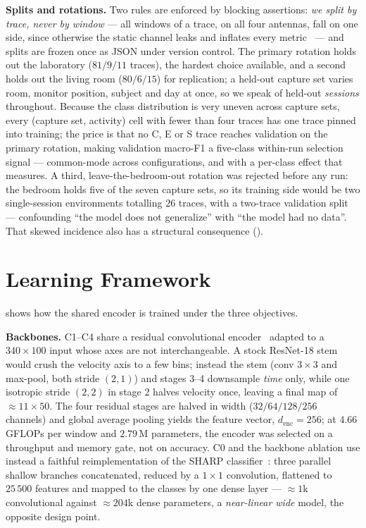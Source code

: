 \textbf{Splits and rotations.} Two rules are enforced by blocking assertions:
\emph{we split by trace, never by window} --- all windows of a trace, on all
four antennas, fall on one side, since otherwise the static channel leaks and
inflates every metric~\cite{Hammerla-2015} --- and splits are frozen once as JSON under version
control. The primary rotation holds out the laboratory ($81/9/11$ traces), the
hardest choice available, and a second holds out the living room ($80/6/15$)
for replication; a held-out capture set varies room, monitor position, subject
and day at once, so we speak of held-out \emph{sessions} throughout. Because
the class distribution is very uneven across capture sets, every (capture set,
activity) cell with fewer than four traces has one trace pinned into training;
the price is that no C, E or S trace reaches validation on the primary
rotation, making validation macro-F1 a five-class within-run selection signal
--- common-mode across configurations, and with a per-class effect that
 measures. A third, leave-the-bedroom-out rotation was
rejected before any run: the bedroom holds five of the seven capture sets, so
its training side would be two single-session environments totalling $26$
traces, with a two-trace validation split --- confounding ``the model does not
generalize'' with ``the model had no data''. That skewed incidence also has a
structural consequence ().

\section{Learning Framework}
\label{sec:learning_framework}

 shows how the shared encoder is trained under the three
objectives.

\textbf{Backbones.} C1--C4 share a residual convolutional
encoder~\cite{He-2016} adapted to a $340\times100$ input whose axes are not
interchangeable. A stock ResNet-18 stem would crush the velocity axis to a few
bins; instead the stem (conv $3{\times}3$ and max-pool, both stride $(2,1)$)
and stages 3--4 downsample \emph{time} only, while one isotropic stride
$(2,2)$ in stage 2 halves velocity once, leaving a final map of
$\approx11{\times}50$. The four residual stages are halved in width
($32/64/128/256$ channels) and global average pooling yields the feature
vector, $d_{\mathrm{enc}}=256$; at $4.66$ GFLOPs per window and $2.79$\,M
parameters, the encoder was selected on a throughput and memory gate, not on
accuracy. C0 and the backbone ablation use instead a faithful reimplementation
of the SHARP classifier~\cite{Meneghello-2023}: three parallel shallow
branches concatenated, reduced by a $1{\times}1$ convolution, flattened to
$25\,500$ features and mapped to the classes by one dense layer ---
$\approx1$k convolutional against $\approx204$k dense parameters, a
\emph{near-linear wide} model, the opposite design point.

